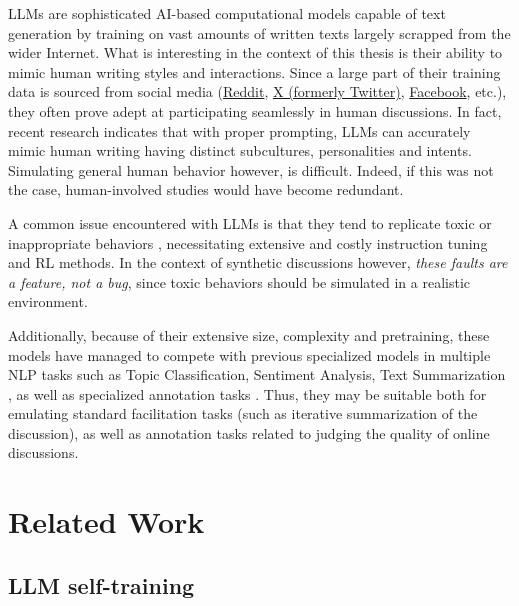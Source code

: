 \acp{LLM} are sophisticated \ac{AI}-based computational models capable of text generation by training on vast amounts of written texts largely scrapped from the wider Internet. 
What is interesting in the context of this thesis is their ability to mimic human writing styles and interactions. Since a large part of their training data is sourced from social media (\href{https://www.reddit.com}{Reddit}, \href{https://www.twitter.com}{X (formerly Twitter)}, \href{https://www.facebook.com}{Facebook}, etc.), they often prove adept at participating seamlessly in human discussions. In fact, recent research \cite{Vezhnevets2023GenerativeAM, aher2023usinglargelanguagemodels} indicates that with proper prompting, LLMs can accurately mimic human writing having distinct subcultures, personalities and intents. Simulating general human behavior however, is difficult. Indeed, if this was not the case, human-involved studies would have become redundant.

A common issue encountered with LLMs is that they tend to replicate toxic or inappropriate behaviors \cite{Birkun_Gautam_2023}, necessitating extensive and costly instruction tuning and \ac{RL} methods. In the context of synthetic discussions however, \textit{these faults are a feature, not a bug}, since toxic behaviors should be simulated in a realistic environment.

Additionally, because of their extensive size, complexity and pretraining, these models have managed to compete with  previous specialized models in multiple \ac{NLP} tasks such as Topic Classification, Sentiment Analysis, Text Summarization \cite{ts2024}, as well as specialized annotation tasks \cite{tan2024largelanguagemodelsdata}. Thus, they may be suitable both for emulating standard facilitation tasks (such as iterative summarization of the discussion), as well as annotation tasks related to judging the quality of online discussions.

\section{Related Work}
\label{sec:related:sec2}

\subsection{LLM self-training}
\label{sec:related:self-train}


